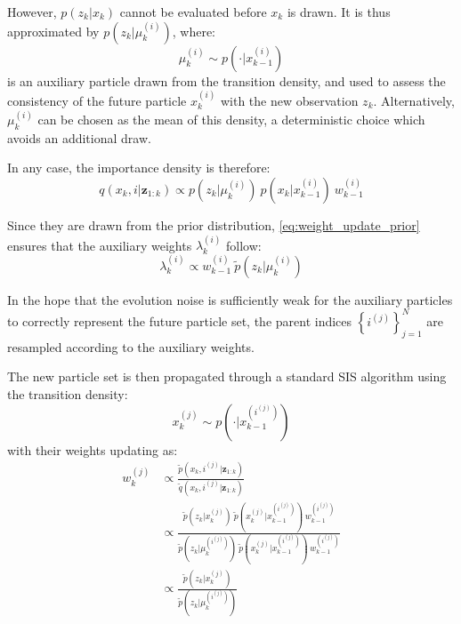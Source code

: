 However, $p(z_k|x_k)$ cannot be evaluated before $x_k$ is drawn. It is thus approximated by $p\left(z_k|\mu_k^{(i)}\right)$, where:
\begin{equation}
	\mu_k^{(i)}\sim p\left(\cdot|x_{k-1}^{(i)}\right)
\end{equation}
is an auxiliary particle drawn from the transition density, and used to assess the consistency of the future particle $x_k^{(i)}$ with the new observation $z_k$. Alternatively, $\mu_k^{(i)}$ can be chosen as the mean of this density, a deterministic choice which avoids an additional draw.

In any case, the importance density is therefore:
\begin{equation}
	q(x_k,i|\mathbf{z}_{1:k})\propto p\left(z_k|\mu_k^{(i)}\right)\:p\left(x_k|x_{k-1}^{(i)}\right)\:w_{k-1}^{(i)}
\end{equation}

Since they are drawn from the prior distribution, \eqref{eq:weight_update_prior} ensures that the auxiliary weights $\lambda_k^{(i)}$ follow:
\begin{equation}
	\lambda_k^{(i)}\propto w_{k-1}^{(i)}\:\tilde{p}\left(z_k|\mu_k^{(i)}\right)
\end{equation}

In the hope that the evolution noise is sufficiently weak for the auxiliary particles to correctly represent the future particle set, the parent indices $\left\{i^{(j)}\right\}_{j=1}^N$ are resampled according to the auxiliary weights.

The new particle set is then propagated through a standard SIS algorithm using the transition density:
\begin{equation}
	x_k^{(j)}\sim p\left(\cdot|x_{k-1}^{\left(i^{(j)}\right)}\right)
\end{equation}
with their weights updating as:
\begin{equation}
	\begin{aligned}
	w_k^{(j)}&\propto\frac{\tilde{p}\left(x_k,i^{(j)}|\mathbf{z}_{1:k}\right)}{\tilde{q}\left(x_k,i^{(j)}|\mathbf{z}_{1:k}\right)}\\
	&\propto\frac{\tilde{p}\left(z_k|x_k^{(j)}\right)\:\tilde{p}\left(x_k^{(j)}|x_{k-1}^{\left(i^{(j)}\right)}\right)\:w_{k-1}^{\left(i^{(j)}\right)}}{\tilde{p}\left(z_k|\mu_k^{\left(i^{(j)}\right)}\right)\:\tilde{p}\left(x_k^{(j)}|x_{k-1}^{\left(i^{(j)}\right)}\right)\:w_{k-1}^{\left(i^{(j)}\right)}}\\
	&\propto\frac{\tilde{p}\left(z_k|x_k^{(j)}\right)}{\tilde{p}\left(z_k|\mu_k^{\left(i^{(j)}\right)}\right)}
	\end{aligned}
\end{equation}

